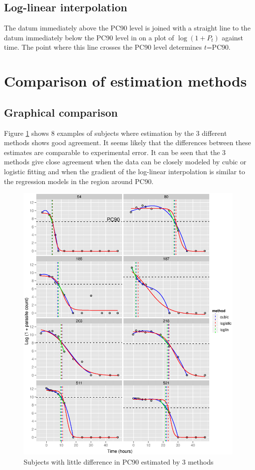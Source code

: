 \subsection{Log-linear interpolation}
The datum immediately above the PC90 level is joined with a straight line to the datum immediately below the PC90 level in on a plot of $\log(1+P_{t})$ against time. The point where this line crosses the PC90 level determines $t$=PC90.
\section{Comparison of estimation methods}
\subsection{Graphical comparison}
Figure \ref{pc90-agree} shows 8 examples of subjects where estimation by the 3 different methods shows good agreement. It seems likely that the differences between these estimates are comparable to experimental error. It can be seen that the 3 methods give close agreement when the data can be closely modeled by cubic or logistic fitting and when the gradient of the log-linear interpolation is similar to the regression models in the region around PC90. 
\begin{figure}[h]
\includegraphics[width=6.5in]{pc90-agree.eps} 
\caption{Subjects with little difference in PC90 estimated by 3 methods}
\label{pc90-agree}
\end{figure}

